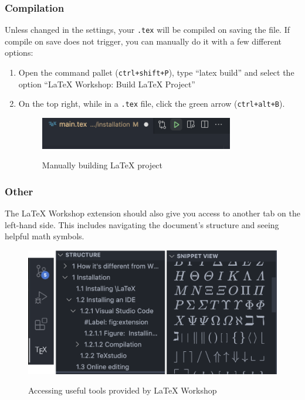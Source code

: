 \subsubsection{Compilation}
Unless changed in the settings, your \texttt{.tex} will be compiled on saving the file.
If compile on save does not trigger, you can manually do it with a few different options:
\begin{enumerate}
    \item Open the command pallet (\verb|ctrl+shift+P|), type ``latex build'' and select the option ``LaTeX Workshop: Build LaTeX Project''
    \item On the top right, while in a \texttt{.tex} file, click the green arrow (\texttt{ctrl+alt+B}).
    \begin{figure}[h]
    \centering
        \includegraphics[width=0.8\textwidth]{figures/build.png}
    \label{fig:build}
    \caption{Manually building LaTeX project}
    \end{figure}
\end{enumerate} 

\subsubsection{Other}
The LaTeX Workshop extension should also give you access to another tab on the left-hand side.
This includes navigating the document's structure and seeing helpful math symbols.
\begin{figure}[h]
\centering
    \includegraphics[width=\textwidth]{figures/symbols.png}
\label{fig:symbols}
\caption{Accessing useful tools provided by LaTeX Workshop}
\end{figure}

